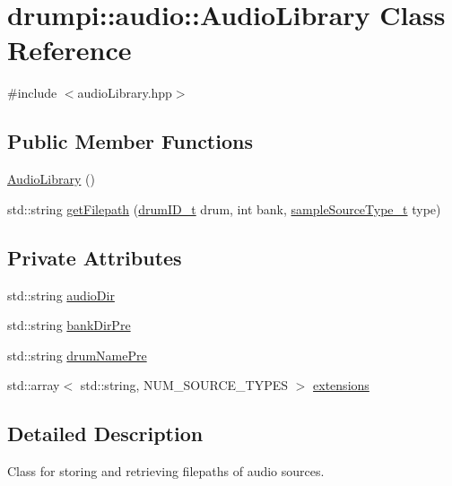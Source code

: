 \hypertarget{classdrumpi_1_1audio_1_1AudioLibrary}{}\section{drumpi\+:\+:audio\+:\+:Audio\+Library Class Reference}
\label{classdrumpi_1_1audio_1_1AudioLibrary}


{\ttfamily \#include $<$audio\+Library.\+hpp$>$}

\subsection*{Public Member Functions}
\begin{DoxyCompactItemize}
\item 
\hyperlink{classdrumpi_1_1audio_1_1AudioLibrary_a5cb11b64bbaaaa6ce88802b9bc755124}{Audio\+Library} ()
\item 
std\+::string \hyperlink{classdrumpi_1_1audio_1_1AudioLibrary_aee472542d978644160d578e0f9d51ded}{get\+Filepath} (\hyperlink{namespacedrumpi_a3897274035c1b939a604438abe648b1b}{drum\+I\+D\+\_\+t} drum, int bank, \hyperlink{namespacedrumpi_1_1audio_a997f55e8a5b5348cf74dbedb7abe8a59}{sample\+Source\+Type\+\_\+t} type)
\end{DoxyCompactItemize}
\subsection*{Private Attributes}
\begin{DoxyCompactItemize}
\item 
std\+::string \hyperlink{classdrumpi_1_1audio_1_1AudioLibrary_a442d0c17fa82121464f3b2108880f4d1}{audio\+Dir}
\item 
std\+::string \hyperlink{classdrumpi_1_1audio_1_1AudioLibrary_a2f61269a92b8961afe13a994290e273e}{bank\+Dir\+Pre}
\item 
std\+::string \hyperlink{classdrumpi_1_1audio_1_1AudioLibrary_a5ca1e85586737e053ff1278868b94878}{drum\+Name\+Pre}
\item 
std\+::array$<$ std\+::string, N\+U\+M\+\_\+\+S\+O\+U\+R\+C\+E\+\_\+\+T\+Y\+P\+ES $>$ \hyperlink{classdrumpi_1_1audio_1_1AudioLibrary_a064522c821b6ec210166aa44c3003777}{extensions}
\end{DoxyCompactItemize}


\subsection{Detailed Description}
Class for storing and retrieving filepaths of audio sources. 

